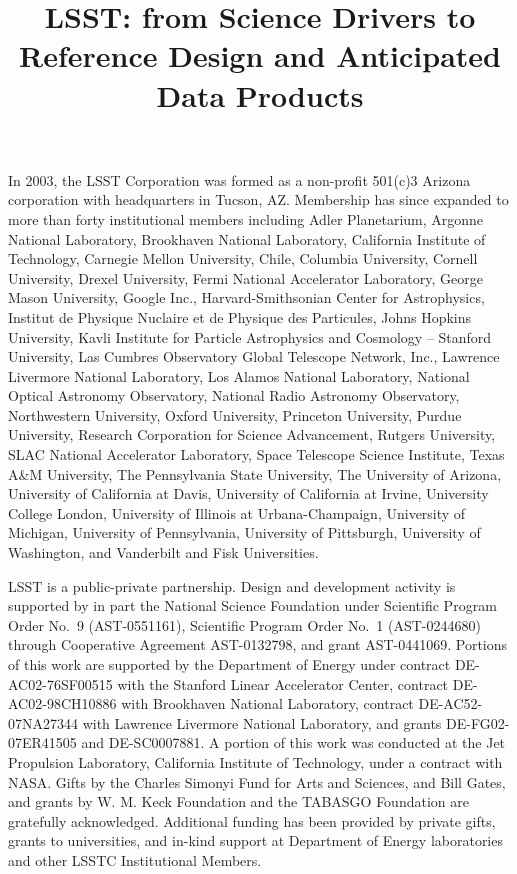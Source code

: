 \documentclass[twocolumn]{aastex61}
\begin{document}
\title{LSST: from Science Drivers to Reference Design and Anticipated Data Products}













\acknowledgments
In 2003, the LSST Corporation was formed as a non-profit 501(c)3 Arizona corporation
with headquarters in Tucson, AZ.  Membership has since expanded to
more than forty institutional members
including Adler Planetarium, Argonne National Laboratory, Brookhaven National Laboratory, California Institute of Technology,
Carnegie Mellon University, Chile,  Columbia University, Cornell University, Drexel University,
Fermi National Accelerator Laboratory, George Mason University, Google Inc., Harvard-Smithsonian
Center for Astrophysics, Institut de Physique Nuclaire et de Physique des Particules, Johns Hopkins
University, Kavli Institute for Particle Astrophysics and Cosmology -- Stanford University, Las
Cumbres Observatory Global Telescope Network, Inc., Lawrence Livermore National Laboratory,
Los Alamos National Laboratory,  National Optical Astronomy
Observatory, National Radio Astronomy Observatory, Northwestern
University, Oxford University,
Princeton University, Purdue University, Research Corporation for Science Advancement, Rutgers
University, SLAC National Accelerator Laboratory, Space Telescope Science Institute,
Texas A\&M University, The Pennsylvania State University, The University of Arizona, University
of California at Davis, University of California at Irvine, University College London, University of
Illinois at Urbana-Champaign, University of Michigan, University of Pennsylvania, University of
Pittsburgh, University of Washington, and Vanderbilt and Fisk Universities.

LSST is a public-private partnership.  Design and development activity is
supported by in part the National Science Foundation under Scientific
Program Order No.~9 (AST-0551161), Scientific Program Order No.~1
(AST-0244680) through Cooperative Agreement AST-0132798, and grant AST-0441069.
Portions of this work are supported by the Department of Energy under contract
DE-AC02-76SF00515 with the Stanford Linear Accelerator Center, contract
DE-AC02-98CH10886 with Brookhaven National Laboratory, contract
DE-AC52-07NA27344 with Lawrence Livermore National Laboratory, and grants
DE-FG02-07ER41505 and DE-SC0007881. A portion of this work was conducted at the Jet Propulsion
Laboratory, California Institute of Technology, under a contract with NASA.
Gifts by the Charles Simonyi Fund for Arts and Sciences,
and Bill Gates, and grants by W. M. Keck Foundation and the TABASGO Foundation
are gratefully acknowledged. Additional funding has been provided by private gifts, grants
to universities, and in-kind support at Department of Energy laboratories and other
LSSTC Institutional Members.
\end{document}
